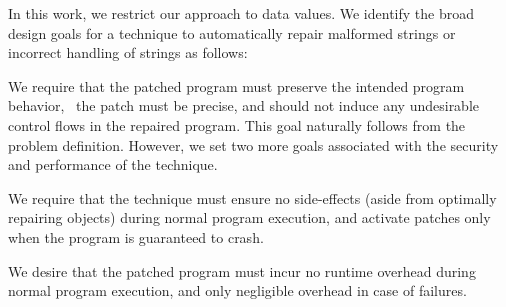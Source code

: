 


In this work, we restrict our approach to  data values. We identify
the broad design goals for a technique to automatically repair malformed strings or
incorrect handling of strings as follows:


 We require that the patched program must
preserve the intended program behavior, \ie\ the patch must be precise, and
should not induce any undesirable control flows in the repaired program. 
This goal naturally follows from the problem definition. However, we set two
more goals associated with the security and performance of the technique.

 We require that the technique
must ensure no side-effects (aside from optimally repairing objects) during
normal program execution, and activate patches only when the program is
guaranteed to crash.

 We desire that the patched program must
incur no runtime overhead during normal program execution, and only negligible
overhead in case of failures.

